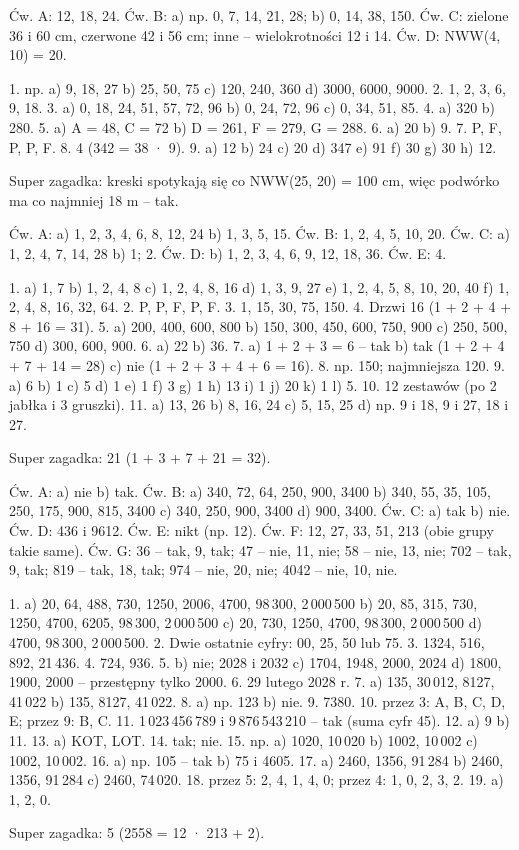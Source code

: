 \newcommand\odp[1]{\par\smallskip{\color{pomd}\bfseries #1}\par}
\odp{1. Wielokrotności}
Ćw. A: 12, 18, 24. Ćw. B: a) np. 0, 7, 14, 21, 28; b) 0, 14, 38, 150. Ćw. C: zielone 36 i 60 cm, czerwone 42 i 56 cm; inne – wielokrotności 12 i 14. Ćw. D: NWW(4, 10) = 20.\par
1. np. a) 9, 18, 27 b) 25, 50, 75 c) 120, 240, 360 d) 3000, 6000, 9000.
2. 1, 2, 3, 6, 9, 18.
3. a) 0, 18, 24, 51, 57, 72, 96 b) 0, 24, 72, 96 c) 0, 34, 51, 85.
4. a) 320 b) 280.
5. a) A = 48, C = 72 b) D = 261, F = 279, G = 288.
6. a) 20 b) 9.
7. P, F, P, P, F.
8. 4 (342 = 38 · 9).
9. a) 12 b) 24 c) 20 d) 347 e) 91 f) 30 g) 30 h) 12.\par
Super zagadka: kreski spotykają się co NWW(25, 20) = 100 cm, więc podwórko ma co najmniej 18 m – tak.

\odp{2. Dzielniki}
Ćw. A: a) 1, 2, 3, 4, 6, 8, 12, 24 b) 1, 3, 5, 15. Ćw. B: 1, 2, 4, 5, 10, 20. Ćw. C: a) 1, 2, 4, 7, 14, 28 b) 1; 2. Ćw. D: b) 1, 2, 3, 4, 6, 9, 12, 18, 36. Ćw. E: 4.\par
1. a) 1, 7 b) 1, 2, 4, 8 c) 1, 2, 4, 8, 16 d) 1, 3, 9, 27 e) 1, 2, 4, 5, 8, 10, 20, 40 f) 1, 2, 4, 8, 16, 32, 64.
2. P, P, F, P, F.
3. 1, 15, 30, 75, 150.
4. Drzwi 16 (1 + 2 + 4 + 8 + 16 = 31).
5. a) 200, 400, 600, 800 b) 150, 300, 450, 600, 750, 900 c) 250, 500, 750 d) 300, 600, 900.
6. a) 22 b) 36.
7. a) 1 + 2 + 3 = 6 – tak b) tak (1 + 2 + 4 + 7 + 14 = 28) c) nie (1 + 2 + 3 + 4 + 6 = 16).
8. np. 150; najmniejsza 120.
9. a) 6 b) 1 c) 5 d) 1 e) 1 f) 3 g) 1 h) 13 i) 1 j) 20 k) 1 l) 5.
10. 12 zestawów (po 2 jabłka i 3 gruszki).
11. a) 13, 26 b) 8, 16, 24 c) 5, 15, 25 d) np. 9 i 18, 9 i 27, 18 i 27.\par
Super zagadka: 21 (1 + 3 + 7 + 21 = 32).

\odp{3. Cechy podzielności}
Ćw. A: a) nie b) tak. Ćw. B: a) 340, 72, 64, 250, 900, 3400 b) 340, 55, 35, 105, 250, 175, 900, 815, 3400 c) 340, 250, 900, 3400 d) 900, 3400. Ćw. C: a) tak b) nie. Ćw. D: 436 i 9612. Ćw. E: nikt (np. 12). Ćw. F: 12, 27, 33, 51, 213 (obie grupy takie same). Ćw. G: 36 – tak, 9, tak; 47 – nie, 11, nie; 58 – nie, 13, nie; 702 – tak, 9, tak; 819 – tak, 18, tak; 974 – nie, 20, nie; 4042 – nie, 10, nie.\par
1. a) 20, 64, 488, 730, 1250, 2006, 4700, 98\,300, 2\,000\,500 b) 20, 85, 315, 730, 1250, 4700, 6205, 98\,300, 2\,000\,500 c) 20, 730, 1250, 4700, 98\,300, 2\,000\,500 d) 4700, 98\,300, 2\,000\,500.
2. Dwie ostatnie cyfry: 00, 25, 50 lub 75.
3. 1324, 516, 892, 21\,436.
4. 724, 936.
5. b) nie; 2028 i 2032 c) 1704, 1948, 2000, 2024 d) 1800, 1900, 2000 – przestępny tylko 2000.
6. 29 lutego 2028 r.
7. a) 135, 30\,012, 8127, 41\,022 b) 135, 8127, 41\,022.
8. a) np. 123 b) nie.
9. 7380.
10. przez 3: A, B, C, D, E; przez 9: B, C.
11. 1\,023\,456\,789 i 9\,876\,543\,210 – tak (suma cyfr 45).
12. a) 9 b) 11.
13. a) KOT, LOT.
14. tak; nie.
15. np. a) 1020, 10\,020 b) 1002, 10\,002 c) 1002, 10\,002.
16. a) np. 105 – tak b) 75 i 4605.
17. a) 2460, 1356, 91\,284 b) 2460, 1356, 91\,284 c) 2460, 74\,020.
18. przez 5: 2, 4, 1, 4, 0; przez 4: 1, 0, 2, 3, 2.
19. a) 1, 2, 0.\par
Super zagadka: 5 (2558 = 12 · 213 + 2).

